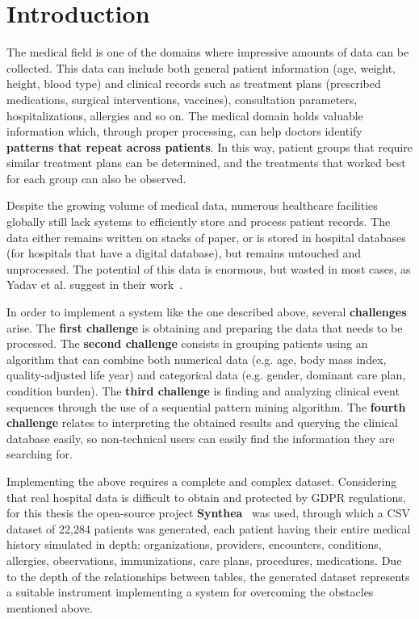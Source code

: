 \chapter{Introduction}\label{ch:introduction}

\pagestyle{fancy}

The medical field is one of the domains where impressive amounts of data can be collected. This data can include both general patient information (age, weight, height, blood type) and clinical records such as treatment plans (prescribed medications, surgical interventions, vaccines), consultation parameters, hospitalizations, allergies and so on. The medical domain holds valuable information which, through proper processing, can help doctors identify \textbf{patterns that repeat across patients}. In this way, patient groups that require similar treatment plans can be determined, and the treatments that worked best for each group can also be observed.

Despite the growing volume of medical data, numerous healthcare facilities globally still lack systems to efficiently store and process patient records. The data either remains written on stacks of paper, or is stored in hospital databases (for hospitals that have a digital database), but remains untouched and unprocessed. The potential of this data is enormous, but wasted in most cases, as Yadav et al. suggest in their work~\cite{Yadav2018MiningEHR}.

In order to implement a system like the one described above, several \textbf{challenges} arise. The \textbf{first challenge} is obtaining and preparing the data that needs to be processed. The \textbf{second challenge} consists in grouping patients using an algorithm that can combine both numerical data (e.g. age, body mass index, quality-adjusted life year) and categorical data (e.g. gender, dominant care plan, condition burden). The \textbf{third challenge} is finding and analyzing clinical event sequences through the use of a sequential pattern mining algorithm. The \textbf{fourth challenge} relates to interpreting the obtained results and querying the clinical database easily, so non-technical users can easily find the information they are searching for.

Implementing the above requires a complete and complex dataset. Considering that real hospital data is difficult to obtain and protected by GDPR regulations, for this thesis the open-source project \textbf{Synthea}~\cite{walonoski2017} was used, through which a CSV dataset of 22,284 patients was generated, each patient having their entire medical history simulated in depth: organizations, providers, encounters, conditions, allergies, observations, immunizations, care plans, procedures, medications. Due to the depth of the relationships between tables, the generated dataset represents a suitable instrument implementing a system for overcoming the obstacles mentioned above.

